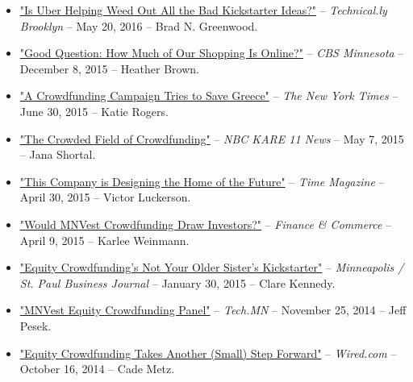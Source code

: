 \documentclass[10.5pt,letterpaper,sans]{moderncv}        %
\begin{document}
\begin{itemize}
\item \textcolor{gray}{\href{http://technical.ly/brooklyn/2016/05/20/uber-kickstarter-brad-greenwood/}{"Is Uber Helping Weed Out All the Bad Kickstarter Ideas?"}} -- \textit{Technical.ly Brooklyn} -- May 20, 2016 -- Brad N. Greenwood.

\item \textcolor{gray}{\href{http://minnesota.cbslocal.com/2015/12/08/good-question-how-much-of-our-shopping-is-online/}{"Good Question: How Much of Our Shopping Is Online?"}} -- \textit{CBS Minnesota} -- December 8, 2015 -- Heather Brown.

\item \textcolor{gray}{\href{http://www.nytimes.com/2015/07/01/world/europe/a-crowdfunding-campaign-tries-to-save-greece.html}{"A Crowdfunding Campaign Tries to Save Greece"}} -- \textit{The New York Times} -- June 30, 2015 -- Katie Rogers. 

\item \textcolor{gray}{\href{http://www.kare11.com/story/news/local/2015/05/06/the-crowded-field-of-crowdfunding/70921732/}{"The Crowded Field of Crowdfunding"}} -- \textit{NBC KARE 11 News} -- May 7, 2015 -- Jana Shortal.

\item \textcolor{gray}{\href{http://time.com/3841448/this-company-is-designing-the-home-of-the-future/}{"This Company is Designing the Home of the Future"}} -- \textit{Time Magazine} -- April 30, 2015 -- Victor Luckerson.

\item \textcolor{gray}{\href{http://finance-commerce.com/2015/04/would-mnvest-crowdfunding-draw-investors/}{"Would MNVest Crowdfunding Draw Investors?"}} -- \textit{Finance \& Commerce} -- April 9, 2015 -- Karlee Weinmann.

\item \textcolor{gray}{\href{http://www.bizjournals.com/twincities/print-edition/2015/01/30/equity-crowdfunding-gordon-burtch.html}{"Equity Crowdfunding's Not Your Older Sister's Kickstarter"}} -- \textit{Minneapolis / St. Paul Business Journal} -- January 30, 2015 -- Clare Kennedy.

\item \textcolor{gray}{\href{http://tech.mn/news/2014/11/25/video-mnvest-equity-crowdfunding-panel/}{"MNVest Equity Crowdfunding Panel"}} -- \textit{Tech.MN} -- November 25, 2014 -- Jeff Pesek.

\item \textcolor{gray}{\href{http://www.wired.com/2014/10/equity-crowdfunding-takes-another-small-step-forward/}{"Equity Crowdfunding Takes Another (Small) Step Forward"}} -- \textit{Wired.com} -- October 16, 2014 -- Cade Metz.


\end{itemize}
\end{document}
